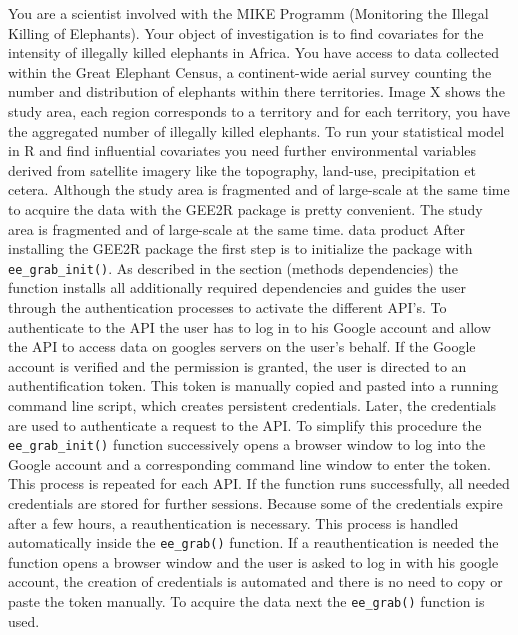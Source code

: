 \documentclass[11pt,twoside,a4paper,final]{report}
\begin{document}
You are a scientist involved with the MIKE Programm (Monitoring the Illegal Killing of Elephants). Your object of investigation is to find covariates for the intensity of illegally killed elephants in Africa. You have access to data collected within the Great Elephant Census, a continent-wide aerial survey counting the number and distribution of elephants within there territories. 
Image X shows the study area, each region corresponds to a territory and for each territory, you have the aggregated number of illegally killed elephants. To run your statistical model in R and find influential covariates you need further environmental variables derived from satellite imagery like the topography, land-use, precipitation et cetera. 
Although the study area is fragmented and of large-scale at the same time to acquire the data with the GEE2R package is pretty convenient.
The study area is fragmented and of large-scale at the same time. 
data product
After installing the GEE2R package the first step is to initialize the package with \texttt{ee\_grab\_init()}. As described in the section (methods dependencies) the function installs all additionally required dependencies and guides the user through the authentication processes to activate the different API's. To authenticate to the API the user has to log in to his Google account and allow the API to access data on googles servers on the user's behalf. If the Google account is verified and the permission is granted, the user is directed to an authentification token. This token is manually copied and pasted into a running command line script, which creates persistent credentials. 
Later, the credentials are used to authenticate a request to the API. To simplify this procedure the \texttt{ee\_grab\_init()} function successively opens a browser window to log into the Google account and a corresponding command line window to enter the token. This process is repeated for each API. If the function runs successfully, all needed credentials are stored for further sessions. Because some of the credentials expire after a few hours, a reauthentication is necessary. This process is handled automatically inside the \texttt{ee\_grab()} function. If a reauthentication is needed the function opens a browser window and the user is asked to log in with his google account, the creation of credentials is automated and there is no need to copy or paste the token manually.
To acquire the data next the \texttt{ee\_grab()} function is used.
\end{document}
